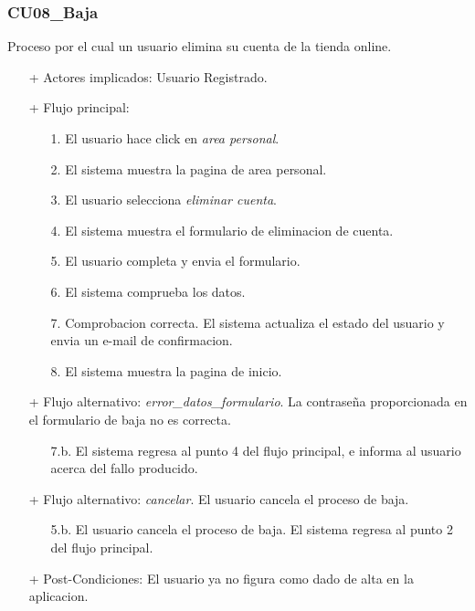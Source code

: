 \documentclass[a4paper]{report}
\begin{document}
            \subsubsection{CU08\_Baja}
                Proceso por el cual un usuario elimina su cuenta de la tienda online.
                \begin{itemize}
                    \item[+] Actores implicados: Usuario Registrado.
                    \item[+] Flujo principal:
                    \begin{enumerate}
                        \item[1.] El usuario hace click en \emph{area personal}.
                        \item[2.] El sistema muestra la pagina de area personal.
                        \item[3.] El usuario selecciona \emph{eliminar cuenta}.
                        \item[4.] El sistema muestra el formulario de eliminacion de cuenta.
                        \item[5.] El usuario completa y envia el formulario.
                        \item[6.] El sistema comprueba los datos.
                        \item[7.] Comprobacion correcta. El sistema actualiza el estado del usuario y envia un e-mail de confirmacion.
                        \item[8.] El sistema muestra la pagina de inicio.
                    \end{enumerate}
                    \item[+] Flujo alternativo: \emph{error\_datos\_formulario}. La contrase\~na proporcionada en el formulario de baja no es correcta.
                    \begin{itemize}
                        \item[7.b.] El sistema regresa al punto 4 del flujo principal, e informa al usuario acerca del fallo producido.
                    \end{itemize}
                    \item[+] Flujo alternativo: \emph{cancelar}. El usuario cancela el proceso de baja.
                    \begin{itemize}
                        \item[5.b.] El usuario cancela el proceso de baja. El sistema regresa al punto 2 del flujo principal.
                    \end{itemize}
                    \item[+] Post-Condiciones: El usuario ya no figura como dado de alta en la aplicacion.
                \end{itemize}
\end{document}
